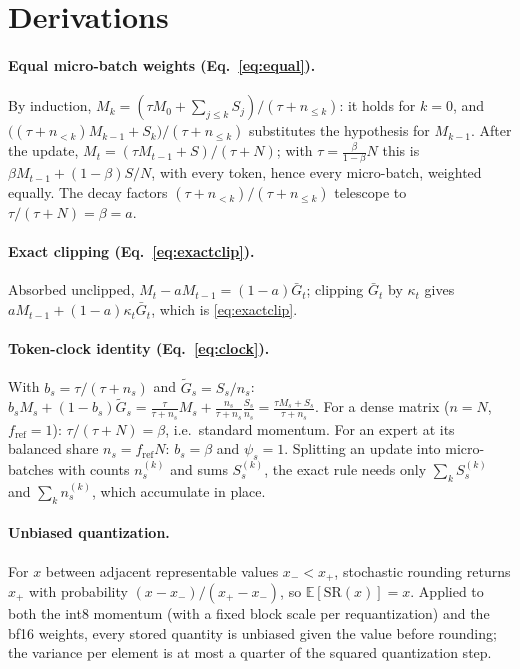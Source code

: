 \documentclass[10pt]{article}
\begin{document}



\clearpage
\appendix
\section{Derivations}
\label{app:deriv}
\paragraph{Equal micro-batch weights (Eq.~\ref{eq:equal}).} By induction, $M_k=(\tau M_0+\sum_{j\le k}S_j)/(\tau+n_{\le k})$:
it holds for $k=0$, and $\big((\tau+n_{<k})M_{k-1}+S_k\big)/(\tau+n_{\le k})$ substitutes the hypothesis for $M_{k-1}$.
After the update, $M_t=(\tau M_{t-1}+S)/(\tau+N)$; with $\tau=\tfrac{\beta}{1-\beta}N$ this is
$\beta M_{t-1}+(1-\beta)S/N$, with every token, hence every micro-batch, weighted equally. The decay factors
$(\tau+n_{<k})/(\tau+n_{\le k})$ telescope to $\tau/(\tau+N)=\beta=a$.

\paragraph{Exact clipping (Eq.~\ref{eq:exactclip}).} Absorbed unclipped, $M_t-aM_{t-1}=(1-a)\bar G_t$; clipping
$\bar G_t$ by $\kappa_t$ gives $aM_{t-1}+(1-a)\kappa_t\bar G_t$, which is \eqref{eq:exactclip}.

\paragraph{Token-clock identity (Eq.~\ref{eq:clock}).} With $b_s=\tau/(\tau+n_s)$ and $\tilde G_s=S_s/n_s$:
$b_sM_s+(1-b_s)\tilde G_s=\frac{\tau}{\tau+n_s}M_s+\frac{n_s}{\tau+n_s}\frac{S_s}{n_s}=\frac{\tau M_s+S_s}{\tau+n_s}$.
For a dense matrix ($n=N$, $f_{\mathrm{ref}}=1$): $\tau/(\tau+N)=\beta$, i.e.\ standard momentum. For an expert at its
balanced share $n_s=f_{\mathrm{ref}}N$: $b_s=\beta$ and $\psi_s=1$. Splitting an update into micro-batches with
counts $n_s^{(k)}$ and sums $S_s^{(k)}$, the exact rule needs only $\sum_kS_s^{(k)}$ and $\sum_kn_s^{(k)}$, which
accumulate in place.

\paragraph{Unbiased quantization.} For $x$ between adjacent representable values $x_-<x_+$, stochastic rounding
returns $x_+$ with probability $(x-x_-)/(x_+-x_-)$, so $\mathbb E[\mathrm{SR}(x)]=x$. Applied to both the int8 momentum
(with a fixed block scale per requantization) and the bf16 weights, every stored quantity is unbiased given the
value before rounding; the variance per element is at most a quarter of the squared quantization step.
\end{document}
